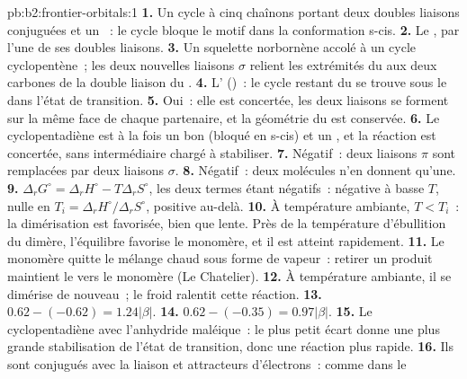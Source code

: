 \begin{solution}{pb:b2:frontier-orbitals:1}
\textbf{1.} Un cycle à cinq chaînons portant deux doubles liaisons conjuguées et un ~: le cycle
bloque le motif  dans la conformation s-cis.
\textbf{2.} Le , par l'une de ses doubles liaisons.
\textbf{3.} Un squelette norbornène accolé à un cycle cyclopentène~; les deux nouvelles liaisons $\sigma$ relient
les extrémités du  aux deux carbones de la double liaison du .
\textbf{4.} L' ()~: le cycle restant du  se trouve sous
le  dans l'état de transition.
\textbf{5.} Oui~: elle est concertée, les deux liaisons se forment sur la même face de chaque partenaire, et la
géométrie du  est conservée.
\textbf{6.} Le cyclopentadiène est à la fois un bon  (bloqué en s-cis) et un , et la
réaction est concertée, sans intermédiaire chargé à stabiliser.
\textbf{7.} Négatif~: deux liaisons $\pi$ sont remplacées par deux liaisons $\sigma$.
\textbf{8.} Négatif~: deux molécules n'en donnent qu'une.
\textbf{9.} $\Delta_r G^\circ = \Delta_r H^\circ - T\Delta_r S^\circ$, les deux termes étant négatifs~: négative à basse
$T$, nulle en $T_i = \Delta_r H^\circ/\Delta_r S^\circ$, positive au-delà.
\textbf{10.} À température ambiante, $T < T_i$~: la dimérisation est favorisée, bien que lente. Près
de la température d'ébullition du dimère, l'équilibre favorise le monomère, et il est atteint
rapidement.
\textbf{11.} Le monomère quitte le mélange chaud sous forme de vapeur~: retirer un produit maintient le
 vers le monomère (Le Chatelier).
\textbf{12.} À température ambiante, il se dimérise de nouveau~; le froid ralentit cette réaction.
\textbf{13.} $0.62 - (-0.62) = 1.24|\beta|$.
\textbf{14.} $0.62 - (-0.35) = 0.97|\beta|$.
\textbf{15.} Le cyclopentadiène avec l'anhydride maléique~: le plus petit écart donne une plus grande
stabilisation de l'état de transition, donc une réaction plus rapide.
\textbf{16.} Ils sont conjugués avec la liaison  et attracteurs d'électrons~: comme dans le

\end{solution}
